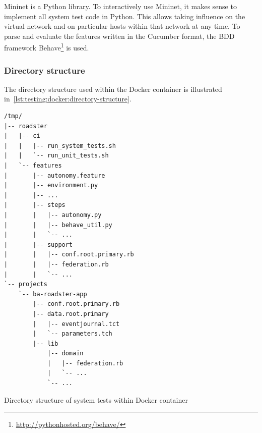 Mininet is a Python library. To interactively use Mininet, it makes sense to
implement all system test code in Python. This allows taking influence on the
virtual network and on particular hosts within that network at any time. To
parse and evaluate the features written in the Cucumber format, the BDD
framework Behave\footnote{\url{http://pythonhosted.org/behave/}} is used.

\subsubsection{Directory structure}

The directory structure used within the Docker container is illustrated
in~\autoref{lst:testing:docker:directory-structure}.

\begin{listing}
	\begin{verbatim}
/tmp/
|-- roadster
|   |-- ci
|   |   |-- run_system_tests.sh
|   |   `-- run_unit_tests.sh
|   `-- features
|       |-- autonomy.feature
|       |-- environment.py
|       |-- ...
|       |-- steps
|       |   |-- autonomy.py
|       |   |-- behave_util.py
|       |   `-- ...
|       |-- support
|       |   |-- conf.root.primary.rb
|       |   |-- federation.rb
|       |   `-- ...
`-- projects
	`-- ba-roadster-app
		|-- conf.root.primary.rb
		|-- data.root.primary
		|   |-- eventjournal.tct
		|   `-- parameters.tch
		|-- lib
			|-- domain
			|   |-- federation.rb
			|   `-- ...
			`-- ...
	\end{verbatim}
	\caption{Directory structure of system tests within Docker container}
	\label{lst:testing:docker:directory-structure}
\end{listing}


